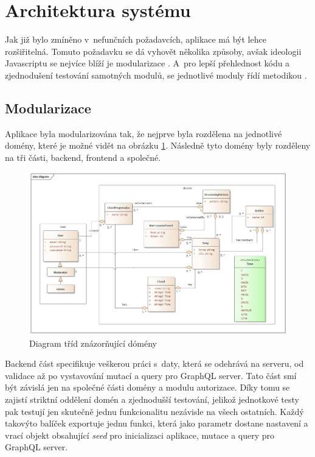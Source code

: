 \section{Architektura systému}
\label{sc:system_architecture}
Jak již bylo zmíněno v~nefunčních požadavcích, aplikace má být lehce rozšiřitelná. Tomuto požadavku se dá vyhovět několika způsoby, avšak ideologii Javascriptu se nejvíce blíží je modularizace \cite{bevacqua_2018_mastering}. A~pro lepší přehlednost kódu a zjednodušení testování samotných modulů, se jednotlivé moduly řídí metodikou .

\subsection{Modularizace}
Aplikace byla modularizována tak, že nejprve byla rozdělena na jednotlivé domény, které je možné vidět na obrázku \ref{fig:class_diagram}. Následně tyto domény byly rozděleny na tři části, backend, frontend a společné.

\begin{figure}
    \centering
    \includegraphics[width=\textwidth]{assets/class_diagram.png}
    \caption{Diagram tříd znázorňující dómény}
    \label{fig:class_diagram}
\end{figure}

Backend část specifikuje veškerou práci s~daty, která se odehrává na serveru, od validace až po vystavování mutací a query pro GraphQL server. Tato část smí být závislá jen na společné části domény a modulu autorizace. Díky tomu se zajistí striktní oddělení domén a zjednodušší testování, jelikož jednotkové testy pak testují jen skutečně jednu funkcionalitu nezávisle na všech ostatních. Každý takovýto balíček exportuje jednu funkci, která jako parametr dostane nastavení a vrací objekt obsahující \emph{seed} pro inicializaci aplikace, mutace a query pro GraphQL server.

